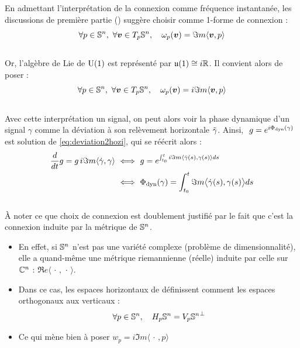 En admettant l'interprétation de la connexion comme fréquence instantanée, les discussions de première partie () suggère choisir comme 1-forme de connexion :
\[\forall p\in\S{n},\ \forall \bf{v}\in\tg[p]{\S{n}},\quad \conn_p(\bf{v}) = \Im m \langle \bf{v}, p\rangle\]
\\
Or, l'algèbre de Lie de $\U{1}$ est représenté par $\mathfrak{u}(1)\cong i\R$. Il convient alors de poser :
\begin{equation} \label{eq:conn2SUPC}
	\forall p\in\S{n},\ \forall \bf{v}\in\tg[p]{\S{n}},\quad \conn_p(\bf{v}) = i\Im m \langle \bf{v}, p\rangle
\end{equation}
\\
Avec cette interprétation un signal, on peut alors voir la phase dynamique d'un signal $\gamma$ comme la déviation à son relèvement horizontale $\Tilde{\gamma}$. Ainsi, $\ g = e^{i\phased(\gamma)}\ $ est solution de \eqref{eq:deviation2hozi}, qui se réécrit alors :
\begin{align*}
	\frac{d}{dt}g  = g\, i\Im m\langle \dot{\gamma} , \gamma \rangle\ &\Llr\ g = e^{\int_{t_0}^t i\Im m\langle \dot{\gamma}(s) , \gamma(s) \rangle ds} \\
	&\Llr\ \phased(\gamma) = \int_{t_0}^t \Im m\big\langle \dot{\gamma}(s) , \gamma(s) \big\rangle ds
\end{align*}
\\

À noter ce que choix de connexion est doublement justifié par le fait que c'est la connexion induite par la métrique de $\S{n}$.
	
\begin{itemize}
	
	\item En effet, si $\S{n}$ n'est pas une variété complexe (problème de dimensionnalité), elle a quand-même une métrique riemannienne (réelle) induite par celle sur $\C^n$ : $\Re e\langle \, \cdot\, ,\, \cdot\, \rangle$.
	
	\item Dans ce cas, les espaces horizontaux de définissent comment les espaces orthogonaux aux verticaux : 
	\[\forall p\in\S{n},\quad \hg[p]{\S{n}} = {\vg[p]{\S{n}}}^\perp\]
	
	\item Ce qui mène bien à poser $w_p = i\Im m \langle\, \cdot\, , p\rangle $ 


	
\end{itemize}






